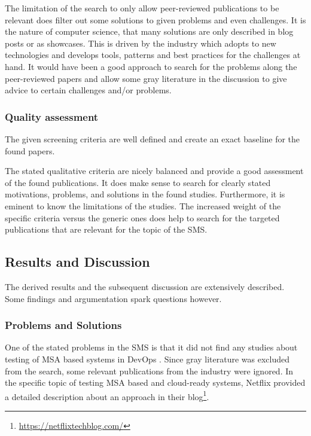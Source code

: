 The limitation of the search to only allow peer-reviewed publications
to be relevant does filter out some solutions to given problems and
even challenges. It is the nature of computer science, that many
solutions are only described in blog posts or as showcases. This
is driven by the industry which adopts to new technologies and develops
tools, patterns and best practices for the challenges at hand.
It would have been a good approach to search for the problems along
the peer-reviewed papers and allow some gray literature in the
discussion to give advice to certain challenges and/or problems.

\subsubsection{Quality assessment}

The given screening criteria are well defined and create
an exact baseline for the found papers.

The stated qualitative criteria are nicely balanced
and provide a good assessment of the found publications.
It does make sense to search for clearly stated motivations,
problems, and solutions in the found studies. Furthermore, it is
eminent to know the limitations of the studies. The increased
weight of the specific criteria versus the generic ones does
help to search for the targeted publications that are relevant
for the topic of the SMS.

\subsection{Results and Discussion}

The derived results and the subsequent discussion are
extensively described. Some findings and argumentation
spark questions however.

\subsubsection{Problems and Solutions}

One of the stated problems in the SMS is that it did not find
any studies about testing of MSA based systems in DevOps \cite{waseem:SMSMSADevOps}.
Since gray literature was excluded from the search, some relevant
publications from the industry were ignored. In the specific topic
of testing MSA based and cloud-ready systems, Netflix provided
a detailed description about an approach in their
blog\footnote{\url{https://netflixtechblog.com/}}.


